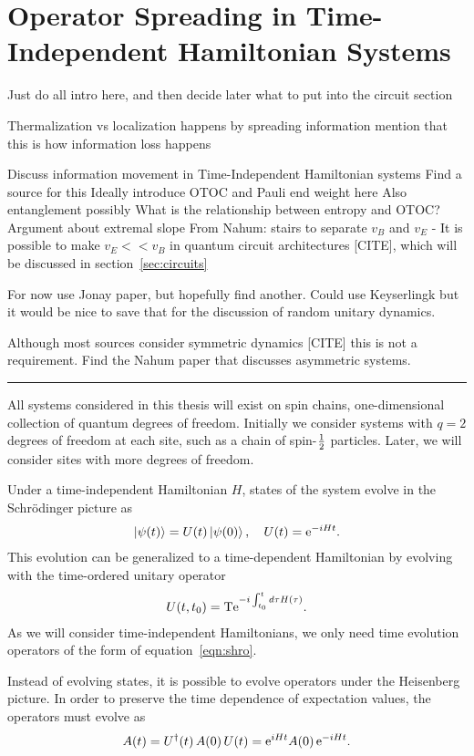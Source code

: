 \section{Operator Spreading in Time-Independent Hamiltonian Systems} \label{sec:opsp}

Just do all intro here, and then decide later what to put into the circuit section

Thermalization 
  vs localization 
  happens by spreading information
  mention that this is how information loss happens

Discuss information movement in Time-Independent Hamiltonian systems
  Find a source for this
  Ideally introduce OTOC and Pauli end weight here
  Also entanglement possibly
  What is the relationship between entropy and OTOC?
  Argument about extremal slope
    From Nahum: stairs to separate $v_B$ and $v_E$ - It is possible to make $v_E << v_B$ in quantum circuit architectures [CITE], which will be discussed in section~\ref{sec:circuits}
    

For now use Jonay paper, but hopefully find another. Could use Keyserlingk but it would be nice to save that for the discussion of random unitary dynamics.

Although most sources consider symmetric dynamics [CITE] this is not a requirement. Find the Nahum paper that discusses asymmetric systems.

\hrule

All systems considered in this thesis will exist on spin chains, one-dimensional collection of quantum degrees of freedom. Initially we consider systems with $q=2$ degrees of freedom at each site, such as a chain of spin-$\frac{1}{2}$ particles. Later, we will consider sites with more degrees of freedom. 

Under a time-independent Hamiltonian $H$, states of the system evolve in the Schr\"odinger picture as 
\begin{align}
\left|\psi(t)\right\rangle = U(t)\left|\psi(0)\right\rangle,\quad U(t) = \text{e}^{-iHt}. \label{eqn:shro}
\end{align}
This evolution can be generalized to a time-dependent Hamiltonian by evolving with the time-ordered unitary operator
\begin{align}
U(t,t_0) = \text{T}\text{e}^{-i\int_{t_0}^td\tau H(\tau)}.\nonumber
\end{align}
As we will consider time-independent Hamiltonians, we only need time evolution operators of the form of equation~\ref{eqn:shro}. 

Instead of evolving states, it is possible to evolve operators under the Heisenberg picture. In order to preserve the time dependence of expectation values, the operators must evolve as 
\begin{align}
A(t) = U^\dag(t)\,A(0)\,U(t) = \text{e}^{iHt}A(0)\,\text{e}^{-iHt}.\label{eqn:heis}
\end{align}

